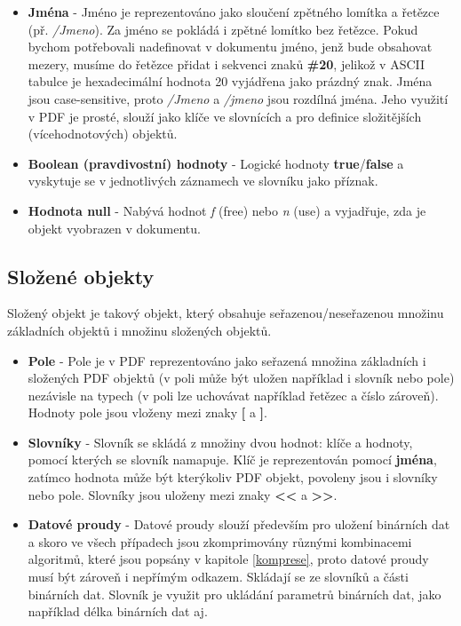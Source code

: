 \begin{itemize}
		\item \textbf{Jména} - Jméno je reprezentováno jako sloučení zpětného lomítka a řetězce (př. \textit{/Jmeno}). Za jméno se pokládá i zpětné lomítko bez řetězce. Pokud bychom potřebovali nadefinovat v dokumentu jméno, jenž bude obsahovat mezery, musíme do řetězce přidat i sekvenci znaků \textbf{\#20}, jelikož v ASCII tabulce je hexadecimální hodnota 20 vyjádřena jako prázdný znak. Jména jsou case-sensitive, proto \textit{/Jmeno} a \textit{/jmeno} jsou rozdílná jména. Jeho využití v PDF je prosté, slouží jako klíče ve slovnících a pro definice složitějších (vícehodnotových) objektů.
		\item \textbf{Boolean (pravdivostní) hodnoty} - Logické hodnoty \textbf{true}/\textbf{false} a vyskytuje se v jednotlivých záznamech ve slovníku jako příznak.
		\item \textbf{Hodnota null} - Nabývá hodnot \textit{f} (free) nebo \textit{n} (use) a vyjadřuje, zda je objekt vyobrazen v dokumentu.
	\end{itemize}
		\subsection{Složené objekty}	
Složený objekt je takový objekt, který obsahuje seřazenou/neseřazenou množinu základních objektů i množinu složených objektů.
	\begin{itemize}
		\item \textbf{Pole} - Pole je v PDF reprezentováno jako seřazená množina základních i složených PDF objektů (v poli může být uložen například i slovník nebo pole) nezávisle na typech (v poli lze uchovávat například řetězec a číslo zároveň). Hodnoty pole jsou vloženy mezi znaky \textbf{[} a \textbf{]}.
		\item \textbf{Slovníky} - Slovník se skládá z množiny dvou hodnot: klíče a hodnoty, pomocí kterých se slovník namapuje. Klíč je reprezentován pomocí \textbf{jména}, zatímco hodnota může být kterýkoliv PDF objekt, povoleny jsou i slovníky nebo pole. Slovníky jsou uloženy mezi znaky \textbf{<<} a \textbf{>>}.
		\item \textbf{Datové proudy} - Datové proudy slouží především pro uložení binárních dat a skoro ve všech případech jsou zkomprimovány různými kombinacemi algoritmů, které jsou popsány v kapitole \ref{komprese}, proto datové proudy musí být zároveň i nepřímým odkazem. Skládají se ze slovníků a části binárních dat. Slovník je využit pro ukládání parametrů binárních dat, jako například délka binárních dat aj.
	\end{itemize}
